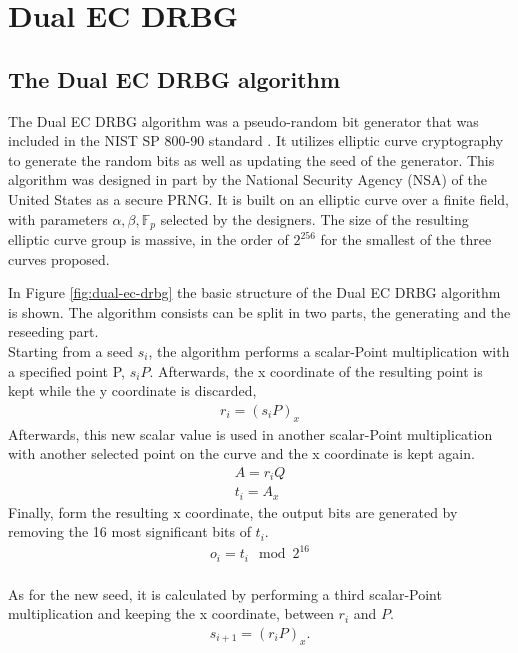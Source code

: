 \section{Dual EC DRBG}

\subsection{The Dual EC DRBG algorithm}

The Dual EC DRBG algorithm was a pseudo-random bit generator that was included in the NIST SP 800-90 standard \cite{nist-sp800-90}. It utilizes elliptic curve cryptography to generate the random bits as well as updating the seed of the generator. This algorithm was designed in part by the National Security Agency (NSA) of the United States as a secure PRNG. It is built on an elliptic curve over a finite field, with parameters $\alpha, \beta, \mathbb{F}_p$ selected by the designers. The size of the resulting elliptic curve group is massive, in the order of $2^{256}$ for the smallest of the three curves proposed.
\\


In Figure \ref{fig:dual-ec-drbg} the basic structure of the Dual EC DRBG algorithm is shown. The algorithm consists can be split in two parts, the generating and the reseeding part. 
\\

Starting from a seed $s_i$, the algorithm performs a scalar-Point multiplication with a specified point P, $s_iP$. Afterwards, the x coordinate of the resulting point is kept while the y coordinate is discarded, 
\begin{gather}
    r_i = {(s_iP)}_x    
\end{gather}
Afterwards, this new scalar value is used in another scalar-Point multiplication with another selected point on the curve and the x coordinate is kept again.
\begin{gather}
    A = r_iQ \\
    t_i = A_{x}
\end{gather}
Finally, form the resulting x coordinate, the output bits are generated by removing the 16 most significant bits of $t_i$.
\begin{gather}
    o_i = t_i \mod 2^{16}
\end{gather}
\\

\noindent
As for the new seed, it is calculated by performing a third scalar-Point multiplication and keeping the x coordinate, between $r_i$ and $P$.
\begin{gather}
    s_{i+1} = {(r_iP)}_x.
\end{gather}

